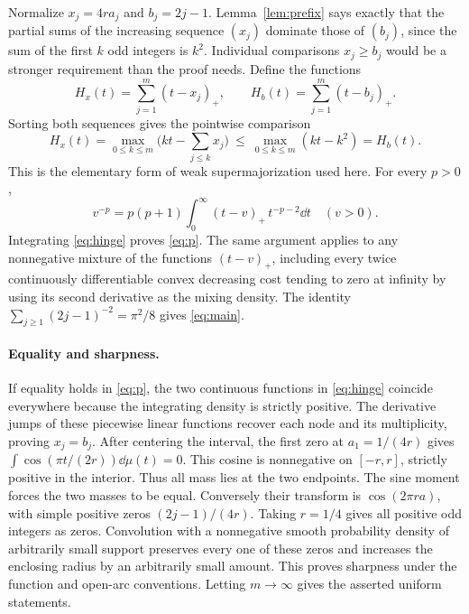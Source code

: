 \documentclass[11pt]{article}
\begin{document}
Normalize $x_j=4r a_j$ and $b_j=2j-1$. Lemma~\ref{lem:prefix} says exactly that the partial sums of the increasing sequence $(x_j)$ dominate those of $(b_j)$, since the sum of the first $k$ odd integers is $k^2$. Individual comparisons $x_j\ge b_j$ would be a stronger requirement than the proof needs. Define the functions
\[
 H_x(t)=\sum_{j=1}^m (t-x_j)_+,\qquad H_b(t)=\sum_{j=1}^m (t-b_j)_+ .
\]
Sorting both sequences gives the pointwise comparison
\begin{equation}\label{eq:hinge}
 H_x(t)=\max_{0\le k\le m}\biggl(kt-\sum_{j\le k}x_j\biggr)
 \ \le\ \max_{0\le k\le m}(kt-k^2)=H_b(t).
\end{equation}
This is the elementary form of weak supermajorization used here. For every $p>0$,
\[
 v^{-p}=p(p+1)\int_0^\infty(t-v)_+\,t^{-p-2}\dd t\quad(v>0).
\]
Integrating \eqref{eq:hinge} proves \eqref{eq:p}. The same argument applies to any nonnegative mixture of the functions $(t-v)_+$, including every twice continuously differentiable convex decreasing cost tending to zero at infinity by using its second derivative as the mixing density. The identity $\sum_{j\ge1}(2j-1)^{-2}=\pi^2/8$ gives \eqref{eq:main}.

\paragraph{Equality and sharpness.}
If equality holds in \eqref{eq:p}, the two continuous functions in \eqref{eq:hinge} coincide everywhere because the integrating density is strictly positive. The derivative jumps of these piecewise linear functions recover each node and its multiplicity, proving $x_j=b_j$. After centering the interval, the first zero at $a_1=1/(4r)$ gives $\int\cos(\pi t/(2r))\dd\mu(t)=0$. This cosine is nonnegative on $[-r,r]$, strictly positive in the interior. Thus all mass lies at the two endpoints. The sine moment forces the two masses to be equal. Conversely their transform is $\cos(2\pi r a)$, with simple positive zeros $(2j-1)/(4r)$. Taking $r=1/4$ gives all positive odd integers as zeros. Convolution with a nonnegative smooth probability density of arbitrarily small support preserves every one of these zeros and increases the enclosing radius by an arbitrarily small amount. This proves sharpness under the function and open-arc conventions. Letting $m\to\infty$ gives the asserted uniform statements.
\end{document}
